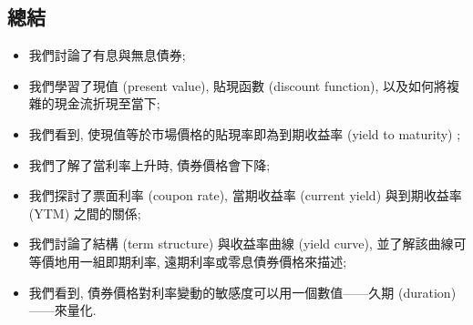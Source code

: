 \documentclass[letterpaper]{article}
\begin{document}
		\subsection{總結}
		\begin{itemize}
			\item 我們討論了有息與無息債券; 
			\item 我們學習了現值 (present value), 貼現函數 (discount function), 以及如何將複雜的現金流折現至當下; 
			\item 我們看到, 使現值等於市場價格的貼現率即為到期收益率 (yield to maturity) ; 
			\item 我們了解了當利率上升時, 債券價格會下降; 
			\item 我們探討了票面利率 (coupon rate), 當期收益率 (current yield) 與到期收益率 (YTM) 之間的關係; 
			\item 我們討論了結構 (term structure) 與收益率曲線 (yield curve), 並了解該曲線可等價地用一組即期利率, 遠期利率或零息債券價格來描述; 
			\item 我們看到, 債券價格對利率變動的敏感度可以用一個數值——久期 (duration) ——來量化.  
		\end{itemize}
		
		
	
\end{document}
